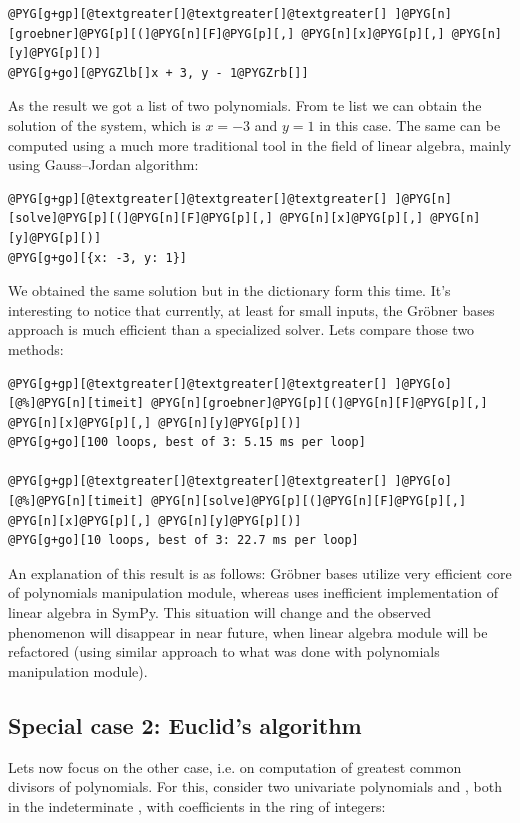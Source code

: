 \begin{Verbatim}[commandchars=@\[\]]
@PYG[g+gp][@textgreater[]@textgreater[]@textgreater[] ]@PYG[n][groebner]@PYG[p][(]@PYG[n][F]@PYG[p][,] @PYG[n][x]@PYG[p][,] @PYG[n][y]@PYG[p][)]
@PYG[g+go][@PYGZlb[]x + 3, y - 1@PYGZrb[]]
\end{Verbatim}
\noindent
As the result we got a list of two polynomials. From te list we can obtain the solution
of the system, which is $x = -3$ and $y = 1$ in this case. The same can be computed using
a much more traditional tool in the field of linear algebra, mainly using Gauss--Jordan
algorithm:

\begin{Verbatim}[commandchars=@\[\]]
@PYG[g+gp][@textgreater[]@textgreater[]@textgreater[] ]@PYG[n][solve]@PYG[p][(]@PYG[n][F]@PYG[p][,] @PYG[n][x]@PYG[p][,] @PYG[n][y]@PYG[p][)]
@PYG[g+go][{x: -3, y: 1}]
\end{Verbatim}
\noindent
We obtained the same solution but in the dictionary form this time. It's interesting to
notice that currently, at least for small inputs, the Gröbner bases approach is much
efficient than a specialized solver. Lets compare those two methods:

\begin{Verbatim}[commandchars=@\[\]]
@PYG[g+gp][@textgreater[]@textgreater[]@textgreater[] ]@PYG[o][@%]@PYG[n][timeit] @PYG[n][groebner]@PYG[p][(]@PYG[n][F]@PYG[p][,] @PYG[n][x]@PYG[p][,] @PYG[n][y]@PYG[p][)]
@PYG[g+go][100 loops, best of 3: 5.15 ms per loop]

@PYG[g+gp][@textgreater[]@textgreater[]@textgreater[] ]@PYG[o][@%]@PYG[n][timeit] @PYG[n][solve]@PYG[p][(]@PYG[n][F]@PYG[p][,] @PYG[n][x]@PYG[p][,] @PYG[n][y]@PYG[p][)]
@PYG[g+go][10 loops, best of 3: 22.7 ms per loop]
\end{Verbatim}
\noindent
An explanation of this result is as follows: Gröbner bases utilize very efficient core
of polynomials manipulation module, whereas  uses inefficient implementation
of linear algebra in SymPy. This situation will change and the observed phenomenon will
disappear in near future, when linear algebra module will be refactored (using similar
approach to what was done with polynomials manipulation module).
\subsection{Special case 2: Euclid's algorithm}\label{thesis-euclid}

Lets now focus on the other case, i.e. on computation of greatest common divisors of polynomials.
For this, consider two univariate polynomials  and , both in the indeterminate ,
with coefficients in the ring of integers:

